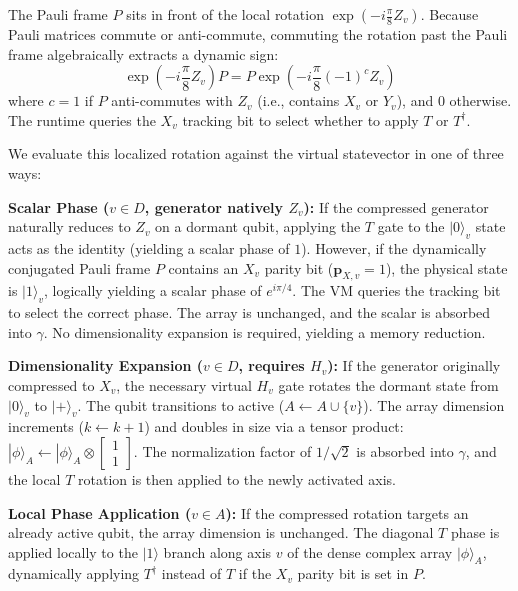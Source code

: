 \documentclass[11pt]{article}
\begin{document}
The Pauli frame $P$ sits in front of the local rotation $\exp(-i \frac{\pi}{8} Z_v)$. Because Pauli matrices commute or anti-commute, commuting the rotation past the Pauli frame algebraically extracts a dynamic sign:
\begin{equation}
    \exp\left(-i \frac{\pi}{8} Z_v\right) P = P \exp\left(-i \frac{\pi}{8} (-1)^c Z_v\right)
\end{equation}
where $c=1$ if $P$ anti-commutes with $Z_v$ (i.e., contains $X_v$ or $Y_v$), and $0$ otherwise. The runtime queries the $X_v$ tracking bit to select whether to apply $T$ or $T^\dagger$.

We evaluate this localized rotation against the virtual statevector in one of three ways:

\textbf{Scalar Phase ($v \in D$, generator natively $Z_v$):} If the compressed generator naturally reduces to $Z_v$ on a dormant qubit, applying the $T$ gate to the $|0\rangle_v$ state acts as the identity (yielding a scalar phase of $1$). However, if the dynamically conjugated Pauli frame $P$ contains an $X_v$ parity bit ($\mathbf{p}_{X,v} = 1$), the physical state is $|1\rangle_v$, logically yielding a scalar phase of $e^{i\pi/4}$. The VM queries the tracking bit to select the correct phase. The array is unchanged, and the scalar is absorbed into $\gamma$. No dimensionality expansion is required, yielding a memory reduction.

\textbf{Dimensionality Expansion ($v \in D$, requires $H_v$):} If the generator originally compressed to $X_v$, the necessary virtual $H_v$ gate rotates the dormant state from $|0\rangle_v$ to $|+\rangle_v$. The qubit transitions to active ($A \leftarrow A \cup \{v\}$). The array dimension increments ($k \leftarrow k+1$) and doubles in size via a tensor product: $|\phi\rangle_A \leftarrow |\phi\rangle_A \otimes \begin{bmatrix} 1 \\ 1 \end{bmatrix}$. The normalization factor of $1/\sqrt{2}$ is absorbed into $\gamma$, and the local $T$ rotation is then applied to the newly activated axis.

\textbf{Local Phase Application ($v \in A$):} If the compressed rotation targets an already active qubit, the array dimension is unchanged. The diagonal $T$ phase is applied locally to the $|1\rangle$ branch along axis $v$ of the dense complex array $|\phi\rangle_A$, dynamically applying $T^\dagger$ instead of $T$ if the $X_v$ parity bit is set in $P$.
\end{document}
